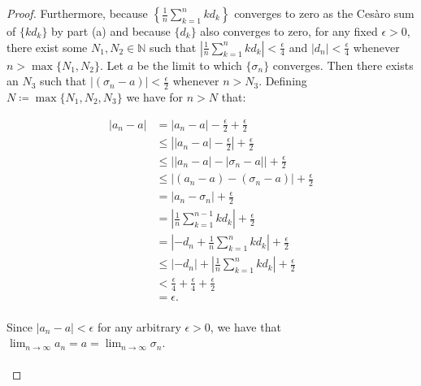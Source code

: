 \begin{proof}
        Furthermore, because
        $\left\{\frac{1}{n}\sum\limits_{k=1}^{n}{kd_k}\right\}$ converges to
        zero as the Cesàro sum of $\{kd_k\}$ by part (a) and because $\{d_k\}$
        also converges to zero\footnotemark[3], for any fixed $\epsilon > 0$,
        there exist some $N_1, N_2 \in \mathbb{N}$ such that
        $\left|\frac{1}{n}\sum\limits_{k=1}^{n}{kd_k}\right| < \frac{\epsilon}{4}$
        and $|d_n| < \frac{\epsilon}{4}$ whenever $n > \max{\{N_1, N_2\}}$. Let
        $a$ be the limit to which $\{\sigma_n\}$ converges. Then there exists
        an $N_3$ such that $|(\sigma_n - a)| < \frac{\epsilon}{2}$ whenever
        $n > N_3$. Defining $N \coloneqq \max{\{N_1, N_2, N_3}\}$ we have for
        $n > N$ that:


        \begin{align*}
            |a_n - a| &= |a_n - a| - \frac{\epsilon}{2} + \frac{\epsilon}{2} \\
                      &\le \left| |a_n - a| - \frac{\epsilon}{2}\right| + \frac{\epsilon}{2}  \\
                      &\le \Big| |a_n - a | - |\sigma_n - a| \Big| + \frac{\epsilon}{2}  \\
                      &\le |(a_n - a ) - (\sigma_n - a)| + \frac{\epsilon}{2} \\
                      &= |a_n - \sigma_n| + \frac{\epsilon}{2} \\
                      &= \left|\frac{1}{n}\sum\limits_{k=1}^{n-1}{kd_k}\right| + \frac{\epsilon}{2} \\
                      &= \left| -d_n + \frac{1}{n}\sum\limits_{k=1}^{n}{kd_k} \right| + \frac{\epsilon}{2} \\
                      &\le |-d_n| + \left|\frac{1}{n}\sum\limits_{k=1}^{n}{kd_k}\right| + \frac{\epsilon}{2} \\
                      &< \frac{\epsilon}{4} + \frac{\epsilon}{4} + \frac{\epsilon}{2} \\
                      &= \epsilon. \\
        \end{align*}

        Since $|a_n - a| < \epsilon$ for any arbitrary $\epsilon > 0$, we have
        that  $\lim_{n \rightarrow \infty}{a_n} = a = \lim_{n \rightarrow \infty}{\sigma_n}$.
        \\\\
        \renewcommand*{\thefootnote}{\arabic{footnote}}

    \end{proof}